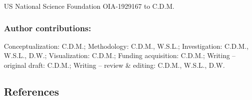 \documentclass[
  letterpaper,
  DIV=11,
  numbers=noendperiod]{scrartcl}
\begin{document}
US National Science Foundation OIA-1929167 to C.D.M.

\subsubsection{Author contributions:}\label{author-contributions}

Conceptualization: C.D.M.; Methodology: C.D.M., W.S.L.; Investigation:
C.D.M., W.S.L., D.W.; Visualization: C.D.M.; Funding acquisition:
C.D.M.; Writing -- original draft: C.D.M.; Writing -- review \& editing:
C.D.M., W.S.L., D.W.

\subsection{References}\label{references}
\end{document}
